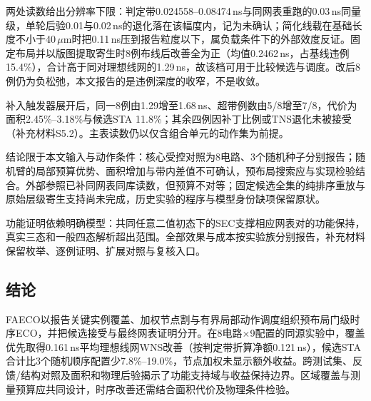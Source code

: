 \documentclass[twocolumn,10pt,fontset=windows]{ctexart}
\begin{document}
两处读数给出分辨率下限：判定带0.024558--0.08474\,ns与同网表重跑的0.03\,ns同量级，单轮后验0.01与0.02\,ns的退化落在该幅度内，记为未确认；简化线载在基础长度不小于40\,$\mu$m时把0.11\,ns压到报告粒度以下，属负载条件下的外部效度反证。固定布局并以版图提取寄生时8例布线后改善全为正（均值0.2462\,ns，占基线违例15.4\%），合计高于同对理想线网的1.29\,ns，故该档可用于比较候选与调度。改后8例仍为负松弛，本文报告的是违例深度的收窄，不是收敛。

补入触发器展开后，同一8例由1.29增至1.68\,ns、超带例数由5/8增至7/8，代价为面积2.45\%--3.18\%与候选STA 11.8\%；其余四例因补丁比例或TNS退化未被接受（补充材料S5.2）。主表读数仍以仅含组合单元的动作集为前提。

结论限于本文输入与动作条件：核心受控对照为8电路、3个随机种子分别报告；随机臂的局部预算优势、面积增加与带内差值不可确认，预布局搜索应与实现检验结合。外部参照已补同网表同库读数，但预算不对等；固定候选全集的纯排序重放与原始层级寄生支持尚未完成，历史实验的程序与模型身份缺项保留原状。

功能证明依赖明确模型：共同任意二值初态下的SEC支撑相应网表对的功能保持，真实三态和一般四态解析超出范围。全部效果与成本按实验族分别报告，补充材料保留枚举、逐例证明、扩展对照与复核入口。

\subsection{结论}

FAECO以报告关键实例覆盖、加权节点割与有界局部动作调度组织预布局门级时序ECO，并把候选接受与最终网表证明分开。在8电路$\times$9配置的同源实验中，覆盖优先取得0.161\,ns平均理想线网WNS改善（按判定带折算净额0.121\,ns），候选STA合计比3个随机顺序配置少7.8\%--19.0\%，节点加权未显示额外收益。跨测试集、反馈/结构对照及面积和物理后验揭示了功能支持域与收益保持边界。区域覆盖与测量预算应共同设计，时序改善还需结合面积代价及物理条件检验。
\end{document}
